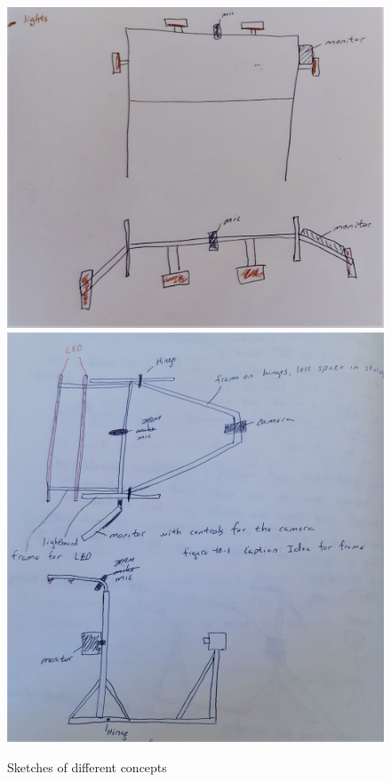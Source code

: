 \documentclass[a4paper]{jpconf}
\begin{document}
\begin{figure}
	\centering
	\includegraphics[width=1\linewidth]{skissa_1.jpg}
	\includegraphics[width=1\linewidth]{skissa_2.jpg}
	\caption{Sketches of different concepts}\label{fig:Sketchesofdifferentconcepts}
\end{figure}
\end{document}
